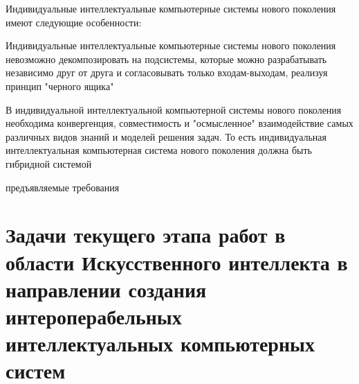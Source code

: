 Индивидуальные интеллектуальные компьютерные системы нового поколения имеют следующие особенности:

\begin{textitemize}
	\item Индивидуальные интеллектуальные компьютерные системы нового поколения невозможно декомпозировать на подсистемы, которые можно разрабатывать независимо друг от друга и согласовывать только входам-выходам, реализуя принцип "черного ящика"{}
	\item В индивидуальной интеллектуальной компьютерной системы нового поколения необходима конвергенция, совместимость и "осмысленное"{} взаимодействие самых различных видов знаний и моделей решения задач. То есть индивидуальная интеллектуальная компьютерная система нового поколения должна быть гибридной системой
\end{textitemize}

\begin{SCn}
	\begin{scnrelfromlist}{предъявляемые требования}
	\end{scnrelfromlist}
\end{SCn}

\section*{Задачи текущего этапа работ в области Искусственного интеллекта в направлении создания интероперабельных интеллектуальных компьютерных систем}


